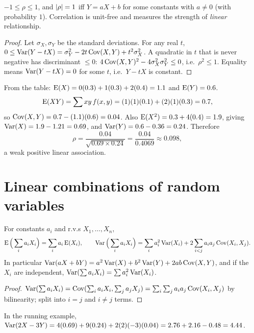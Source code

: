 \begin{theorem}
$-1\le\rho\le 1$, and $\left\lvert \rho \right\rvert = 1$ iff $Y = aX+b$ for some constants with $a\ne0$
(with probability $1$). Correlation is unit-free and measures the strength of
\emph{linear} relationship.
\end{theorem}

\begin{proof}
Let $\sigma_X,\sigma_Y$ be the standard deviations. For any real $t$,
$0\le\operatorname{Var}(Y - tX) = \sigma_Y^2 - 2t\operatorname{Cov}(X,Y) + t^2\sigma_X^2$. A quadratic in $t$ that is
never negative has discriminant $\le0$: $4\operatorname{Cov}(X,Y)^2 - 4\sigma_X^2\sigma_Y^2 \le 0$,
i.e.\ $\rho^2\le1$. Equality means $\operatorname{Var}(Y - tX) = 0$ for some $t$, i.e.\ $Y - tX$ is
constant.
\end{proof}

\begin{example}
From the table: $\operatorname{E}(X) = 0(0.3) + 1(0.3) + 2(0.4) = 1.1$ and $\operatorname{E}(Y) = 0.6$.
\[
  \operatorname{E}(XY) = \sum xy\,f(x,y) = (1)(1)(0.1) + (2)(1)(0.3) = 0.7,
\]
so $\operatorname{Cov}(X,Y) = 0.7 - (1.1)(0.6) = 0.04$. Also $\operatorname{E}(X^2) = 0.3 + 4(0.4) = 1.9$, giving
$\operatorname{Var}(X) = 1.9 - 1.21 = 0.69$, and $\operatorname{Var}(Y) = 0.6 - 0.36 = 0.24$. Therefore
\[
  \rho = \frac{0.04}{\sqrt{0.69\times0.24}} = \frac{0.04}{0.4069} \approx 0.098,
\]
a weak positive linear association.
\end{example}

\section{Linear combinations of random variables}

\begin{theorem}
For constants $a_i$ and r.v.s $X_1,\dots,X_n$,
\[
  \operatorname{E}\Big(\sum_i a_iX_i\Big) = \sum_i a_i\operatorname{E}(X_i), \qquad
  \operatorname{Var}\Big(\sum_i a_iX_i\Big) = \sum_i a_i^2\operatorname{Var}(X_i) + 2\sum_{i<j}a_ia_j\operatorname{Cov}(X_i,X_j).
\]
In particular $\operatorname{Var}(aX + bY) = a^2\operatorname{Var}(X) + b^2\operatorname{Var}(Y) + 2ab\operatorname{Cov}(X,Y)$, and if the $X_i$
are independent, $\operatorname{Var}(\sum a_iX_i) = \sum a_i^2\operatorname{Var}(X_i)$.
\end{theorem}

\begin{proof}
$\operatorname{Var}(\sum a_iX_i) = \operatorname{Cov}(\sum_i a_iX_i, \sum_j a_jX_j) = \sum_i\sum_j a_ia_j\operatorname{Cov}(X_i,X_j)$
by bilinearity; split into $i=j$ and $i\ne j$ terms.
\end{proof}

\begin{example}
In the running example, $\operatorname{Var}(2X - 3Y) = 4(0.69) + 9(0.24) + 2(2)(-3)(0.04) = 2.76 +
2.16 - 0.48 = 4.44$.
\end{example}

